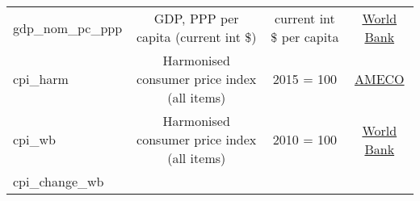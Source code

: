 \documentclass[]{article}
\begin{document}
\begin{longtable}[]{@{}lccc@{}}
\begin{minipage}[t]{0.14\columnwidth}
gdp\_nom\_pc\_ppp\strut
\end{minipage} & \begin{minipage}[t]{0.36\columnwidth}\centering\strut
GDP, PPP per capita (current int \$)\strut
\end{minipage} & \begin{minipage}[t]{0.24\columnwidth}\centering\strut
current int \$ per capita\strut
\end{minipage} & \begin{minipage}[t]{0.15\columnwidth}\centering\strut
\href{https://ec.europa.eu/info/business-economy-euro/indicators-statistics/economic-databases/macro-economic-database-ameco/download-annual-data-set-macro-economic-database-ameco_en}{World
Bank}\strut
\end{minipage}\tabularnewline
\begin{minipage}[t]{0.14\columnwidth}\raggedright\strut
cpi\_harm\strut
\end{minipage} & \begin{minipage}[t]{0.36\columnwidth}\centering\strut
Harmonised consumer price index (all items)\strut
\end{minipage} & \begin{minipage}[t]{0.24\columnwidth}\centering\strut
2015 = 100\strut
\end{minipage} & \begin{minipage}[t]{0.15\columnwidth}\centering\strut
\href{https://ec.europa.eu/info/business-economy-euro/indicators-statistics/economic-databases/macro-economic-database-ameco/download-annual-data-set-macro-economic-database-ameco_en}{AMECO}\strut
\end{minipage}\tabularnewline
\begin{minipage}[t]{0.14\columnwidth}\raggedright\strut
cpi\_wb\strut
\end{minipage} & \begin{minipage}[t]{0.36\columnwidth}\centering\strut
Harmonised consumer price index (all items)\strut
\end{minipage} & \begin{minipage}[t]{0.24\columnwidth}\centering\strut
2010 = 100\strut
\end{minipage} & \begin{minipage}[t]{0.15\columnwidth}\centering\strut
\href{https://data.worldbank.org/indicator/FP.CPI.TOTL}{World
Bank}\strut
\end{minipage}\tabularnewline
\begin{minipage}[t]{0.14\columnwidth}\raggedright\strut
cpi\_change\_wb\strut

\end{minipage}
\end{longtable}
\end{document}
